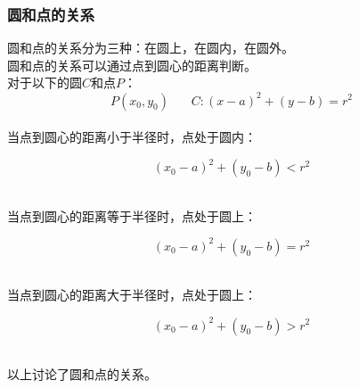 \documentclass[UTF8]{ctexart}
\begin{document}
\subsubsection{圆和点的关系}
    \setcounter{equation}{0}
    圆和点的关系分为三种：在圆上，在圆内，在圆外。\\[3mm]
    圆和点的关系可以通过点到圆心的距离判断。\\[5mm]
    对于以下的圆$C$和点$P$：
    \begin{equation}
        P(x_0,y_0)~~~~~~~~C:(x-a)^2+(y-b)=r^2
    \end{equation}\\
    当点到圆心的距离小于半径时，点处于圆内：
    \begin{large}
        \begin{equation*}
            (x_0-a)^2+(y_0-b)<r^2
        \end{equation*}
    \end{large}\\
    当点到圆心的距离等于半径时，点处于圆上：
    \begin{large}
        \begin{equation*}
            (x_0-a)^2+(y_0-b)=r^2
        \end{equation*}
    \end{large}\\
    当点到圆心的距离大于半径时，点处于圆上：
    \begin{large}
        \begin{equation*}
            (x_0-a)^2+(y_0-b)>r^2
        \end{equation*}
    \end{large}\\
    以上讨论了圆和点的关系。

\newpage
\end{document}

